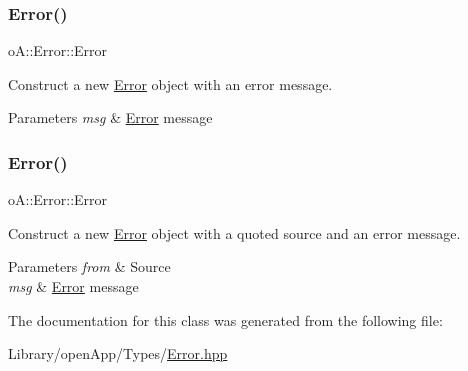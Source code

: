 \subsubsection{\texorpdfstring{Error()}{Error()}\hspace{0.1cm}{\footnotesize\ttfamily [1/2]}}
{\footnotesize\ttfamily o\+A\+::\+Error\+::\+Error\hspace{0.3cm}{\ttfamily [inline]}}



Construct a new \mbox{\hyperlink{classo_a_1_1_error}{Error}} object with an error message. 


\begin{DoxyParams}{Parameters}
{\em msg} & \mbox{\hyperlink{classo_a_1_1_error}{Error}} message \\
\hline
\end{DoxyParams}
\mbox{\label{classo_a_1_1_logic_error_adf66492ca8b03fa14d09e5bba7cdacbd}} 
\subsubsection{\texorpdfstring{Error()}{Error()}\hspace{0.1cm}{\footnotesize\ttfamily [2/2]}}
{\footnotesize\ttfamily o\+A\+::\+Error\+::\+Error\hspace{0.3cm}{\ttfamily [inline]}}



Construct a new \mbox{\hyperlink{classo_a_1_1_error}{Error}} object with a quoted source and an error message. 


\begin{DoxyParams}{Parameters}
{\em from} & Source \\
\hline
{\em msg} & \mbox{\hyperlink{classo_a_1_1_error}{Error}} message \\
\hline
\end{DoxyParams}


The documentation for this class was generated from the following file\+:\begin{DoxyCompactItemize}
\item 
Library/open\+App/\+Types/\mbox{\hyperlink{_error_8hpp}{Error.\+hpp}}\end{DoxyCompactItemize}
